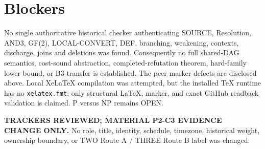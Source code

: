 \documentclass[11pt]{article}
\begin{document}
\section*{Blockers}
No single authoritative historical checker authenticating SOURCE, Resolution, AND3, GF(2), LOCAL-CONVERT, DEF, branching, weakening, contexts, discharge, joins and deletions was found.
Consequently no full shared-DAG semantics, cost-sound abstraction, completed-refutation theorem, hard-family lower bound, or B3 transfer is established.
The peer marker defects are disclosed above.
Local XeLaTeX compilation was attempted, but the installed TeX runtime has no
\texttt{xelatex.fmt}; only structural LaTeX, marker, and exact GitHub readback
validation is claimed.
P versus NP remains OPEN.

\noindent\textbf{TRACKERS REVIEWED; MATERIAL P2-C3 EVIDENCE CHANGE ONLY.}
No role, title, identity, schedule, timezone, historical weight, ownership boundary, or TWO Route A / THREE Route B label was changed.

\end{document}
